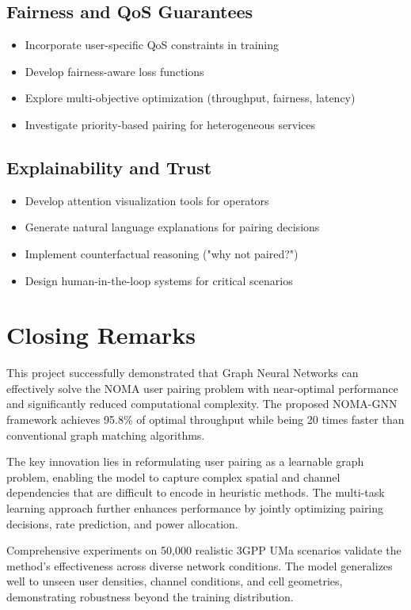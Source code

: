 \subsection{Fairness and QoS Guarantees}
\begin{itemize}
    \item Incorporate user-specific QoS constraints in training
    \item Develop fairness-aware loss functions
    \item Explore multi-objective optimization (throughput, fairness, latency)
    \item Investigate priority-based pairing for heterogeneous services
\end{itemize}

\subsection{Explainability and Trust}
\begin{itemize}
    \item Develop attention visualization tools for operators
    \item Generate natural language explanations for pairing decisions
    \item Implement counterfactual reasoning ("why not paired?")
    \item Design human-in-the-loop systems for critical scenarios
\end{itemize}

\section{Closing Remarks}

This project successfully demonstrated that Graph Neural Networks can effectively solve the NOMA user pairing problem with near-optimal performance and significantly reduced computational complexity. The proposed NOMA-GNN framework achieves 95.8\% of optimal throughput while being 20 times faster than conventional graph matching algorithms.

The key innovation lies in reformulating user pairing as a learnable graph problem, enabling the model to capture complex spatial and channel dependencies that are difficult to encode in heuristic methods. The multi-task learning approach further enhances performance by jointly optimizing pairing decisions, rate prediction, and power allocation.

Comprehensive experiments on 50,000 realistic 3GPP UMa scenarios validate the method's effectiveness across diverse network conditions. The model generalizes well to unseen user densities, channel conditions, and cell geometries, demonstrating robustness beyond the training distribution.

